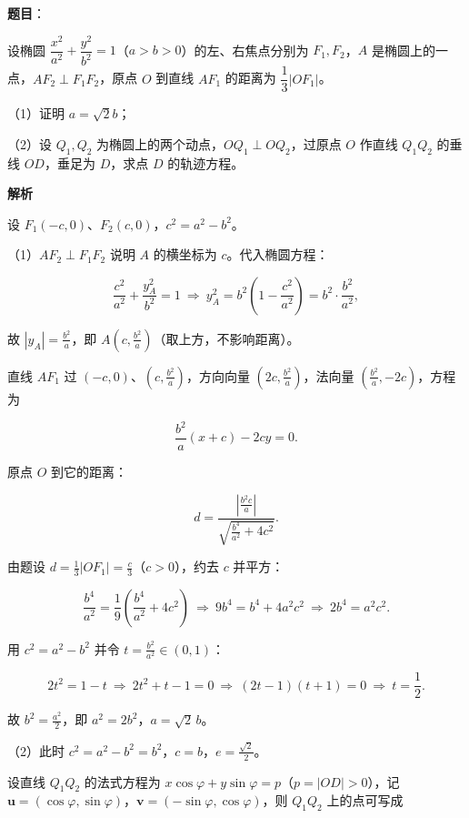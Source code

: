 \begin{answer}

\textbf{题目}：

设椭圆 $\dfrac{x^2}{a^2}+\dfrac{y^2}{b^2}=1$（$a>b>0$）的左、右焦点分别为 $F_1,F_2$，$A$ 是椭圆上的一点，$AF_2\perp F_1F_2$，原点 $O$ 到直线 $AF_1$ 的距离为 $\dfrac{1}{3}|OF_1|$。

（1）证明 $a=\sqrt{2}b$；

（2）设 $Q_1,Q_2$ 为椭圆上的两个动点，$OQ_1\perp OQ_2$，过原点 $O$ 作直线 $Q_1Q_2$ 的垂线 $OD$，垂足为 $D$，求点 $D$ 的轨迹方程。

\textbf{解析}

设 $F_1(-c,0)$、$F_2(c,0)$，$c^2=a^2-b^2$。

（1）$AF_2\perp F_1F_2$ 说明 $A$ 的横坐标为 $c$。代入椭圆方程：

\nopagebreak[4]
\[\frac{c^2}{a^2}+\frac{y_A^2}{b^2}=1\ \Longrightarrow\ y_A^2=b^2\left(1-\frac{c^2}{a^2}\right)=b^2\cdot\frac{b^2}{a^2},\]

故 $\left|y_A\right|=\frac{b^2}a$，即 $A\left(c,\frac{b^2}a\right)$（取上方，不影响距离）。

直线 $AF_1$ 过 $(-c,0)$、$\left(c,\frac{b^2}a\right)$，方向向量 $\left(2c,\frac{b^2}a\right)$，法向量 $\left(\frac{b^2}a,-2c\right)$，方程为

\nopagebreak[4]
\[\frac{b^2}a\left(x+c\right)-2cy=0 .\]

原点 $O$ 到它的距离：

\nopagebreak[4]
\[d=\frac{\left|\frac{b^2c}a\right|}{\sqrt{\frac{b^4}{a^2}+4c^2}} .\]

由题设 $d=\frac13\left|OF_1\right|=\frac c3$（$c>0$），约去 $c$ 并平方：

\nopagebreak[4]
\[\frac{b^4}{a^2}=\frac19\left(\frac{b^4}{a^2}+4c^2\right)\ \Longrightarrow\ 9b^4=b^4+4a^2c^2\ \Longrightarrow\ 2b^4=a^2c^2 .\]

用 $c^2=a^2-b^2$ 并令 $t=\frac{b^2}{a^2}\in(0,1)$：

\nopagebreak[4]
\[2t^2=1-t\ \Longrightarrow\ 2t^2+t-1=0\ \Longrightarrow\ (2t-1)(t+1)=0\ \Longrightarrow\ t=\frac12 .\]

故 $b^2=\frac{a^2}2$，即 $a^2=2b^2$，$a=\sqrt2\,b$。

（2）此时 $c^2=a^2-b^2=b^2$，$c=b$，$e=\frac{\sqrt2}2$。

设直线 $Q_1Q_2$ 的法式方程为 $x\cos\varphi+y\sin\varphi=p$（$p=|OD|>0$），记 $\boldsymbol u=(\cos\varphi,\sin\varphi)$，$\boldsymbol v=(-\sin\varphi,\cos\varphi)$，则 $Q_1Q_2$ 上的点可写成


\end{answer}
